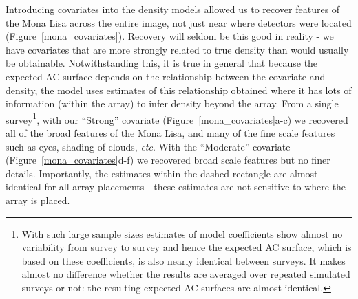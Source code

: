 \documentclass[10pt,a4paper]{article}
\begin{document}
Introducing covariates into the density models allowed us to recover features of the Mona Lisa across the entire image, not just near where detectors were located (Figure~\ref{mona_covariates}). Recovery will seldom be this good in reality - we have covariates that are more strongly related to true density than would usually be obtainable. Notwithstanding this, it is true in general that because the expected AC surface depends on the relationship between the covariate and density, the model uses estimates of this relationship obtained where it has lots of information (within the array) to infer density beyond the array. From a single survey\footnote{With such large sample sizes estimates of model coefficients show almost no variability from survey to survey and hence the expected AC surface, which is based on these coefficients, is also nearly identical between surveys. It makes almost no difference whether the results are averaged over repeated simulated surveys or not: the resulting expected AC surfaces are almost identical.}, with our ``Strong'' covariate (Figure~\ref{mona_covariates}a-c) we recovered all of the broad features of the Mona Lisa, and many of the fine scale features such as eyes, shading of clouds, {\it etc}. With the ``Moderate'' covariate (Figure~\ref{mona_covariates}d-f) we recovered broad scale features but no finer details. Importantly, the estimates within the dashed rectangle are almost identical for all array placements - these estimates are not sensitive to where the array is placed.

\end{document}
